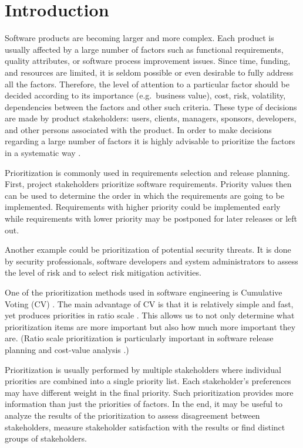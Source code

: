 \section{\label{intro}Introduction}

Software products are becoming larger and more complex. Each product
is usually affected by a large number of factors such as functional
requirements, quality attributes, or software process improvement
issues. Since time, funding, and resources are limited, it is seldom
possible or even desirable to fully address all the factors. Therefore,
the level of attention to a particular factor should be decided according
to its importance (e.g.\ business value), cost, risk, volatility, 
dependencies between the factors and other such criteria. 
These type of decisions are made by product stakeholders:
users, clients, managers, sponsors, developers, and other persons
associated with the product. In order to make decisions regarding a
large number of factors it is highly advisable to prioritize the factors
in a systematic way \cite{Berander2005}.

Prioritization is commonly used in requirements selection and release planning.
First, project stakeholders prioritize software requirements.
Priority values then can be used to determine the order in which the requirements are going to be implemented.
Requirements with higher priority could be implemented early
while requirements with lower priority may be postponed for later releases or left out.

Another example could be prioritization of potential security threats.
It is done by security professionals, software developers and system administrators
to assess the level of risk and to select risk mitigation activities.

One of the prioritization methods used in software engineering is Cumulative Voting (CV) \cite{Leffingwell1999}.
The main advantage of CV is that it is relatively simple and fast, yet produces priorities in ratio scale \cite{Berander2005,Ahl2005}.
This allows us to not only determine what prioritization items are more important but also how much more important they are.
(Ratio scale prioritization is particularly important in software release planning and cost-value analysis \cite{Berander2006a, Karlsson1997}.)

Prioritization is usually performed by multiple stakeholders where individual priorities are combined into a single priority list.
Each stakeholder's preferences may have different weight in the final priority.
Such prioritization provides more information than just the priorities of factors.
In the end, it may be useful to analyze the results of the prioritization to assess disagreement between stakeholders, measure stakeholder satisfaction with the results or find distinct groups of stakeholders.

